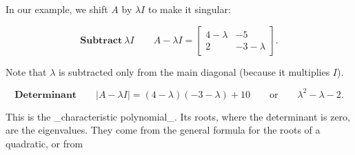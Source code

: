In our example, we shift \(A\) by \(\lambda I\) to make it singular:

\[\textbf{Subtract}\ \lambda I\qquad A-\lambda I=\begin{bmatrix}4-\lambda&-5 \\ 2&-3-\lambda\end{bmatrix}.\]

Note that \(\lambda\) is subtracted only from the main diagonal (because it multiplies \(I\)).

\[\textbf{Determinant}\qquad|A-\lambda I|=(4-\lambda)(-3-\lambda)+10\qquad \text{or}\qquad\lambda^{2}-\lambda-2.\]

This is the _characteristic polynomial_. Its roots, where the determinant is zero, are the eigenvalues. They come from the general formula for the roots of a quadratic, or from 